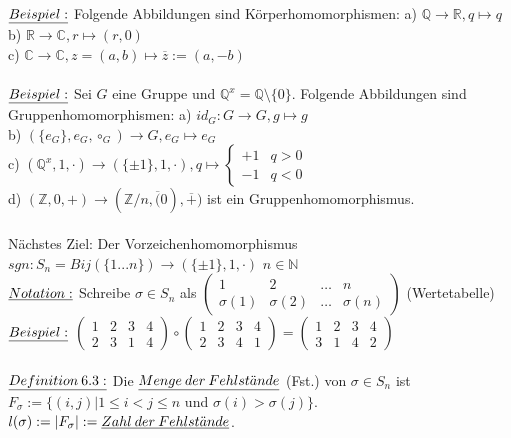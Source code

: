 \documentclass[fleqn, a4paper, 11pt]{article}
\begin{document}
$\uline{Beispiel:}$ Folgende Abbildungen sind K\"orperhomomorphismen: a) $\mathbb{Q}\rightarrow\mathbb{R}, q\mapsto q$\\
b) $\mathbb{R}\rightarrow\mathbb{C}, r\mapsto (r,0)$\\
c) $\mathbb{C}\rightarrow\mathbb{C}, z=(a,b)\mapsto\overline{z}:=(a,-b)$\\
\\
$\uline{Beispiel:}$ Sei $G$ eine Gruppe und $\mathbb{Q}^x=\mathbb{Q}\setminus\{0\}$. Folgende Abbildungen sind Gruppenhomomorphismen: a) $id_G:G\rightarrow G,g\mapsto g$\\
b) $(\{e_G\},e_G,\circ_G)\rightarrow G,e_G\mapsto e_G$\\
c) $(\mathbb{Q}^x,1,\cdot)\rightarrow(\{\pm 1\},1,\cdot),q\mapsto
\begin{cases}
	+1 & q>0\\
	-1 & q<0
\end{cases}$\\
d) $(\mathbb{Z},0,+)\rightarrow(\mathbb{Z}/n,\overline(0),\overline{+})$ ist ein Gruppenhomomorphismus.\\
\\
N\"achstes Ziel: Der Vorzeichenhomomorphismus $sgn:S_n=Bij(\{1...n\})\rightarrow(\{\pm 1\},1,\cdot)$ $n\in\mathbb{N}$\\
$\uline{Notation:}$ Schreibe $\sigma\in S_n$ als 
$\begin{pmatrix}
	1 & 2 & \dots & n\\
	\sigma(1) & \sigma(2) & \dots & \sigma(n)
\end{pmatrix}$ (Wertetabelle)\\
$\uline{Beispiel:}$ $\begin{pmatrix}
	1 & 2 & 3 & 4\\
	2 & 3 & 1 & 4
\end{pmatrix} \circ
\begin{pmatrix}
	1 & 2 & 3 & 4\\
	2 & 3 & 4 & 1
\end{pmatrix} =
\begin{pmatrix}
	1 & 2 & 3 & 4\\
	3 & 1 & 4 & 2
\end{pmatrix}$\\
\\
$\uline{Definition\:6.3:}$ Die $\uline{Menge\:der\:Fehlst\ddot{a}nde}$ (Fst.) von $\sigma\in S_n$ ist $F_\sigma:=\{(i,j)|1\leq i<j\leq n$ und $\sigma(i)>\sigma(j)\}$. $l(\sigma):=|F_\sigma |:=\uline{Zahl\:der\:Fehlst\ddot{a}nde}$.\\
\end{document}
